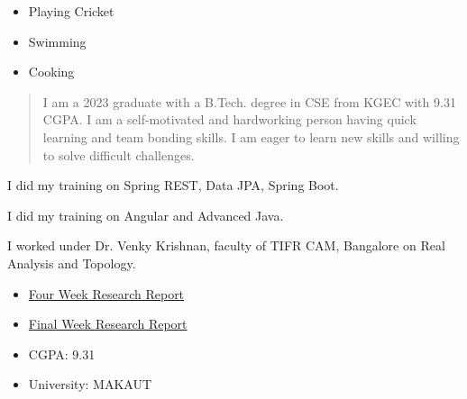 \documentclass[10pt,legalpaper,ragged2e,withhyper]{debjitpalcv}
\newenvironment{sloppypar*}{\sloppy\ignorespaces}{\par}
\begin{document}
\begin{paracol}{2}
    \begin{sloppypar*}
        \begin{itemize}
            \item Playing Cricket
            \item Swimming
            \item Cooking
        \end{itemize}
    \end{sloppypar*}

    \newpage
    \switchcolumn

    \begin{quote}

        I am a 2023 graduate with a B.Tech. degree in CSE from KGEC with 9.31 CGPA. I am a self-motivated and hardworking person having quick learning and team bonding skills. I am eager to learn new skills and willing to solve difficult challenges.

    \end{quote}

    I did my training on Spring REST, Data JPA, Spring Boot.
    \divider

    I did my training on Angular and Advanced Java.
    \divider

    I worked under Dr. Venky Krishnan, faculty of TIFR CAM, Bangalore on Real Analysis and Topology. \\
    \begin{itemize}
        \item \href{https://www.academia.edu/94639467/Four_Week_Research_Report_of_IASC_INSA_NASI_Summer_Research_Fellowship?source=swp_share}{Four Week Research Report}
        \item \href{https://www.academia.edu/94640080/Final_Week_Research_Report_of_IASC_INSA_NASI_Summer_Research_Fellowship?source=swp_share}{Final Week Research Report}
    \end{itemize}

    \begin{minipage}[t]{0.2\textwidth}
        \begin{itemize}
            \item CGPA: 9.31
        \end{itemize}
    \end{minipage}
    \begin{minipage}[t]{0.4\textwidth}
        \begin{itemize}
            \item University: MAKAUT
        \end{itemize}
    \end{minipage}
    \divider


\end{paracol}
\end{document}
